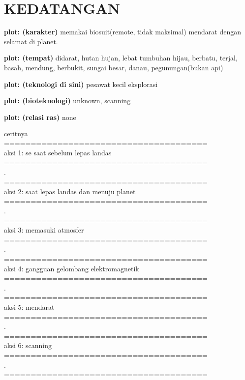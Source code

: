 \chapter{KEDATANGAN}

\textbf{plot: (karakter)} memakai biosuit(remote, tidak maksimal) mendarat dengan selamat di planet.

\textbf{plot: (tempat)} didarat, hutan hujan, lebat tumbuhan hijau, berbatu, terjal, basah, mendung, berbukit, sungai besar, danau, pegunungan(bukan api)

\textbf{plot: (teknologi di sini)} pesawat kecil eksplorasi

\textbf{plot: (bioteknologi)} unknown, scanning

\textbf{plot: (relasi ras)} none

ceritnya\\
======================================\\
aksi 1: se saat sebelum lepas landas\\
======================================\\
.\\
======================================\\
aksi 2: saat lepas landas dan menuju planet\\
======================================\\
.\\
======================================\\
aksi 3: memasuki atmosfer\\
======================================\\
.\\
======================================\\
aksi 4: gangguan gelombang elektromagnetik\\
======================================\\
.\\
======================================\\
aksi 5: mendarat\\
======================================\\
.\\
======================================\\
aksi 6: scanning\\
======================================\\
.\\
======================================\\
